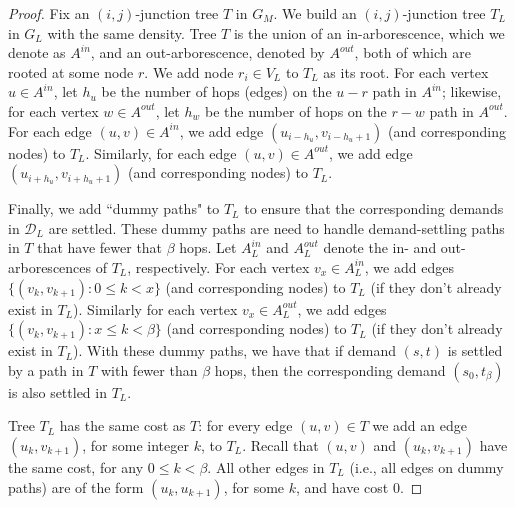 \begin{proof}
    Fix an $(i,j)$-junction tree $T$ in $G_M$. We build an $(i,j)$-junction tree $T_L$ in $G_L$ with the same density. Tree $T$ is the union of an in-arborescence, which we denote as $A^{in}$, and an out-arborescence, denoted by $A^{out}$, both of which are rooted at some node $r$. We add node $r_i \in V_L$ to $T_L$ as its root. 
    For each vertex $u \in A^{in}$, let $h_u$ be the number of hops (edges) on the $u-r$ path in $A^{in}$; likewise, for each vertex $w \in A^{out}$, let $h_w$ be the number of hops on the $r-w$ path in $A^{out}$. For each edge $(u,v) \in A^{in}$, we add edge $(u_{i-h_u}, v_{i-h_u+1})$ (and corresponding nodes) to $T_L$. Similarly, for each edge $(u,v) \in A^{out}$, we add edge $(u_{i+h_u}, v_{i+h_u+1})$ (and corresponding nodes) to $T_L$.
   
    Finally, we add ``dummy paths" to $T_L$ to ensure that the corresponding demands in $\mathcal{D}_L$ are settled. These dummy paths are need to handle demand-settling paths in $T$ that have fewer that $\beta$ hops. Let $A^{in}_L$ and $A^{out}_L$ denote the in- and out-arborescences of $T_L$, respectively. For each vertex $v_x \in A^{in}_L$, we add edges $\{ (v_k, v_{k+1}) :  0 \leq k < x  \}$ (and corresponding nodes) to $T_L$ (if they don't already exist in $T_L$). Similarly for each vertex $v_x \in A^{out}_L$, we add edges $\{ (v_k, v_{k+1}) :  x \leq k < \beta  \}$ (and corresponding nodes) to $T_L$ (if they don't already exist in $T_L$). With these dummy paths, we have that if demand $(s,t)$ is settled by a path in $T$ with fewer than $\beta$ hops, then the corresponding demand $(s_0, t_\beta)$ is also settled in $T_L$.  

    Tree $T_L$ has the same cost as $T$: for every edge $(u,v) \in T$ we add an edge $(u_k, v_{k+1})$, for some integer $k$, to $T_L$. Recall that $(u,v)$ and $(u_k, v_{k+1})$ have the same cost, for any $0 \leq k < \beta$. All other edges in $T_L$ (i.e., all edges on dummy paths) are of the form $(u_k, u_{k+1})$, for some $k$, and have cost $0$. 
    

\end{proof}
